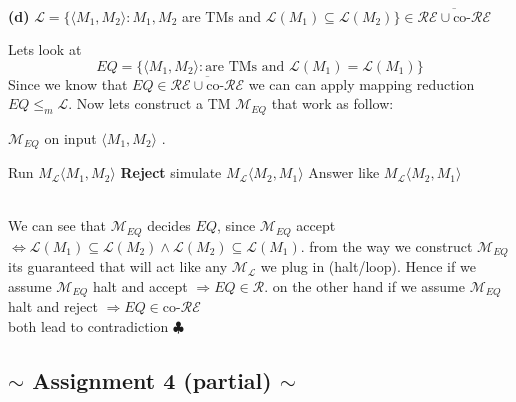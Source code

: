\documentclass[12pt]{article}
\begin{document}
\begin{center}
\hrulefill\\ 
\end{center}
\begin{center}
\textbf{(d)} $\mathcal{L} = \{\langle M_1,M_2\rangle : M_1,M_2 $ are TMs and $\mathcal{L}(M_1)\subseteq \mathcal{L}(M_2)\} \in \overline{\mathcal{RE}\cup\text{co-} \mathcal{RE}}$
\end{center}
 Lets look at \[ EQ=\{ \langle M_1,M_2\rangle :\text{are TMs and } \mathcal{L}(M_1)=\mathcal{L}(M_1)\} \]
Since we know that $EQ\in \overline{\mathcal{RE}\cup\text{co-}\mathcal{RE}}$ we can can apply mapping reduction $EQ\leq_m \mathcal{L}$. Now lets construct a TM $\mathcal{M}_{EQ}$ that work as follow:
\begin{algorithm}
\caption{ $\mathcal{M}_{EQ}$ on input $\langle M_1,M_2\rangle$ .}\label{alg:cap}
\begin{algorithmic} 
\State Run $M_\mathcal{L}\langle M_1,M_2\rangle$
   \textbf{Reject} 
\EndIf
{} simulate $M_\mathcal{L}\langle M_2,M_1\rangle$  
\State Answer like $M_\mathcal{L}\langle M_2,M_1\rangle$ 
\EndIf
\end{algorithmic}
\end{algorithm}\\
We can see that $\mathcal{M}_{EQ}$ decides $EQ$, since $\mathcal{M}_{EQ}$ accept $\Leftrightarrow \mathcal{L}(M_1)\subseteq \mathcal{L}(M_2)\wedge\mathcal{L}(M_2)\subseteq \mathcal{L}(M_1)$.
from the way we construct  $\mathcal{M}_{EQ}$ its guaranteed that will act like any $\mathcal{M_L}$ we plug in (halt/loop). Hence if we assume $\mathcal{M}_{EQ}$ halt and accept  $\Rightarrow EQ\in \mathcal{R}$. on the other hand if we assume $\mathcal{M}_{EQ}$ halt and reject  $\Rightarrow EQ\in \text{co-}\mathcal{RE}$
\\both lead to contradiction $\clubsuit$
\begin{center}
\section{$\sim$ Assignment 4 (partial)   $\sim$}
\end{center}
\end{document}
